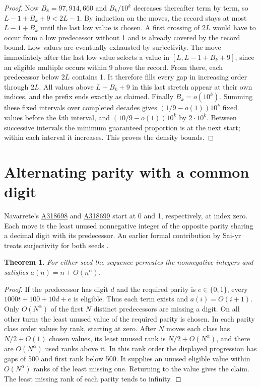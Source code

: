 \documentclass[11pt]{article}
\newtheorem{theorem}{Theorem}\newtheorem{lemma}[theorem]{Lemma}
\newcommand{\seqref}[1]{\href{https://oeis.org/#1}{#1}}
\begin{document}
\begin{proof}
Now $B_8=97{,}914{,}660$ and $B_k/10^k$ decreases thereafter term by term, so $L-1+B_k+9<2L-1$. By induction on the moves, the record stays at most $L-1+B_k$ until the last low value is chosen. A first crossing of $2L$ would have to occur from a low predecessor without 1 and is already covered by the record bound. Low values are eventually exhausted by surjectivity. The move immediately after the last low value selects a value in $[L,L-1+B_k+9]$, since an eligible multiple occurs within 9 above the record. From there, each predecessor below $2L$ contains 1. It therefore fills every gap in increasing order through $2L$. All values above $L+B_k+9$ in this last stretch appear at their own indices, and the prefix ends exactly as claimed. Finally $B_k=o(10^k)$. Summing these fixed intervals over completed decades gives $(1/9-o(1))10^k$ fixed values before the $k$th interval, and $(10/9-o(1))10^k$ by $2\cdot10^k$. Between successive intervals the minimum guaranteed proportion is at the next start; within each interval it increases. This proves the density bounds.
\end{proof}

\section{Alternating parity with a common digit}
Navarrete's \seqref{A318698} and \seqref{A318699} start at 0 and 1, respectively, at index zero. Each move is the least unused nonnegative integer of the opposite parity sharing a decimal digit with its predecessor. An earlier formal contribution by Sai-yr treats surjectivity for both seeds \cite{nav}.
\begin{theorem}For either seed the sequence permutes the nonnegative integers and satisfies $a(n)=n+O(n^\alpha)$.\end{theorem}
\begin{proof}
If the predecessor has digit $d$ and the required parity is $e\in\{0,1\}$, every $1000t+100+10d+e$ is eligible. Thus each term exists and $a(i)=O(i+1)$. Only $O(N^\alpha)$ of the first $N$ distinct predecessors are missing a digit. On all other turns the least unused value of the required parity is chosen. In each parity class order values by rank, starting at zero. After $N$ moves each class has $N/2+O(1)$ chosen values, its least unused rank is $N/2+O(N^\alpha)$, and there are $O(N^\alpha)$ used ranks above it. In this rank order the displayed progression has gaps of 500 and first rank below 500. It supplies an unused eligible value within $O(N^\alpha)$ ranks of the least missing one. Returning to the value gives the claim. The least missing rank of each parity tends to infinity.
\end{proof}
\end{document}
